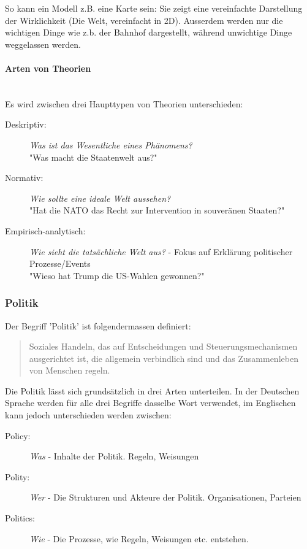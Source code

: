 \documentclass[a4paper, 11pt]{article}
\begin{document}
So kann ein Modell z.B. eine Karte sein: Sie zeigt eine vereinfachte Darstellung der Wirklichkeit (Die Welt, vereinfacht in 2D). Ausserdem werden nur die wichtigen Dinge wie z.b. der Bahnhof dargestellt, während unwichtige Dinge weggelassen werden. 

\paragraph{Arten von Theorien} \mbox{} \\
Es wird zwischen drei Haupttypen von Theorien unterschieden: 

\begin{description}
	\item[Deskriptiv: ] \textit{Was ist das Wesentliche eines Phänomens?} \\
	"Was macht die Staatenwelt aus?"
	\item[Normativ: ] \textit{Wie sollte eine ideale Welt aussehen?} \\
	"Hat die NATO das Recht zur Intervention in souveränen Staaten?"
	\item[Empirisch-analytisch: ] \textit{Wie sieht die tatsächliche Welt aus?} - Fokus auf Erklärung politischer Prozesse/Events \\
	"Wieso hat Trump die US-Wahlen gewonnen?"
\end{description}

\subsubsection{Politik}
Der Begriff 'Politik' ist folgendermassen definiert:

\begin{center}
    \blockquote{Soziales Handeln, das auf Entscheidungen und Steuerungsmechanismen ausgerichtet ist, die allgemein verbindlich sind und das Zusammenleben von Menschen regeln.}
\end{center}

Die Politik lässt sich grundsätzlich in drei Arten unterteilen. In der Deutschen Sprache werden für alle drei Begriffe dasselbe Wort verwendet, im Englischen kann jedoch unterschieden werden zwischen: 
\begin{description}
    \item[Policy: ] \textit{Was} - Inhalte der Politik. Regeln, Weisungen
    \item[Polity:] \textit{Wer} - Die Strukturen und Akteure der Politik.  Organisationen, Parteien 
    \item[Politics:]  \textit{Wie} - Die Prozesse, wie Regeln, Weisungen etc. entstehen.
\end{description}
\end{document}
